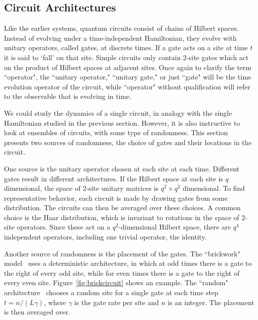 \subsection{Circuit Architectures} \label{sub:arch}

Like the earlier systems, quantum circuits consist of chains of Hilbert spaces. Instead of evolving under a time-independent Hamiltonian, they evolve with unitary operators, called gates, at discrete times. If a gate acts on a site at time $t$ it is said to `fall' on that site. Simple circuits only contain 2-site gates which act on the product of Hilbert spaces at adjacent sites. Once again to clarify the term ``operator", the ``unitary operator," ``unitary gate," or just ``gate" will be the time evolution operator of the circuit, while ``operator" without qualification will refer to the observable that is evolving in time.

We could study the dynamics of a single circuit, in analogy with the single Hamiltonian studied in the previous section. However, it is also instructive to look at ensembles of circuits, with some type of randomness. This section presents two sources of randomness, the choice of gates and their locations in the circuit.

One source is the unitary operator chosen at each site at each time. Different gates result in different architectures. 
If the Hilbert space at each site is $q$ dimensional, the space of 2-site unitary matrices is $q^2\times q^2$ dimensional. To find representative behavior, each circuit is made by drawing gates from some distribution. The circuits can then be averaged over these choices. A common choice is the Haar distribution, which is invariant to rotations in the space of 2-site operators. Since these act on a $q^2$-dimensional Hilbert space, there are $q^4$ independent operators, including one trivial operator, the identity. 

Another source of randomness is the placement of the gates. The ``brickwork" model~\cite{Keyserlingk} uses a deterministic architecture, in which at odd times there is a gate to the right of every odd site, while for even times there is a gate to the right of every even site. Figure~\ref{fig:brickcircuit} shows an example. The ``random" architecture~\cite{Nahum2017} chooses a random site for a single gate at each time step $t = n/(L\gamma)$, where $\gamma$ is the gate rate per site and $n$ is an integer. The placement is then averaged over. 

